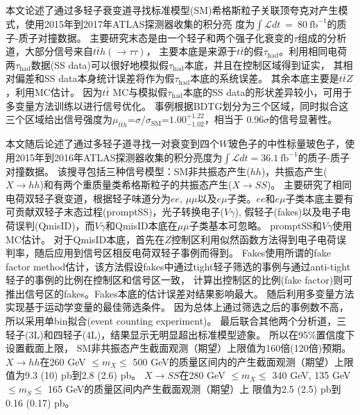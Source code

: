本文论述了通过多轻子衰变道寻找标准模型(SM)希格斯粒子关联顶夸克对产生模式，使用2015年到2017年ATLAS探测器收集的积分亮
度为$\int \mathcal{L}dt~=~80~\text{fb}^{-1}$的质子-质子对撞数据。
主要研究末态是由一个轻子和两个强子化衰变的$\tau$组成的分析道\ltwotau ，大部分信号来自$t\bar{t}h(\rightarrow \tau\tau)$，
主要本底是来源于$t\bar{t}$的假$\tau_{\text{had}}$。利用相同电荷两$\tau_{\text{had}}$数据(SS data)可以很好地模拟假$\tau_{\text{had}}$本底，并且在控制区域得到证实，
其相对偏差和SS data本身统计误差将作为假$\tau_{\text{had}}$本底的系统误差。
其余本底主要是$t\bar{t}Z$，利用MC估计。
因为$t\bar{t}$ MC与模拟假$\tau_{\text{had}}$本底的SS data的形状差异较小，可用于多变量方法训练以进行信号优化。
事例根据BDTG划分为三个区域，同时拟合这三个区域给出信号强度为$\mu_{t\bar{t}h}$=$\sigma/\sigma_{\text{SM}}$=$1.00^{+1.22}_{-1.02}$，相当于
$0.96\sigma$的信号显著性。

本文随后论述了通过多轻子道寻找一对衰变到四个$W$玻色子的中性标量玻色子，使用2015年到2016年ATLAS探测器收集的积分亮度为$\int \mathcal{L}dt=36.1~\text{fb}^{-1}$的质子-质子对撞数据。
该搜寻包括三种信号模型：SM非共振态产生($hh$)，共振态产生($X\rightarrow hh$)和有两个重质量类希格斯粒子的共振态产生($X\rightarrow SS$)。
主要研究了相同电荷双轻子衰变道，根据轻子味道分为$ee$, $\mu\mu$以及$e\mu$子类。$ee$和$e\mu$子类本底主要有可贡献双轻子末态过程(promptSS)，光子转换电子($V\gamma$),
假轻子(fakes)以及电子电荷误判(QmisID)，而$V\gamma$和QmisID本底在$\mu\mu$子类基本可忽略。
promptSS和$V\gamma$使用MC估计。
对于QmisID本底，首先在$Z$控制区利用似然函数方法得到电子电荷误判率，随后应用到信号区相反电荷双轻子事例而得到。
Fakes使用所谓的fake factor method估计，该方法假设fakes中通过tight轻子筛选的事例与通过anti-tight轻子的事例的比例在控制区和信号区一致，
计算出控制区的比例(fake factor)则可推出信号区的fakes。Fakes本底的估计误差对结果影响最大。
随后利用多变量方法实现基于运动学变量的最佳筛选条件。
因为总体上通过筛选之后的事例数不高，所以采用单bin拟合(event counting experiment)。
最后联合其他两个分析道，三轻子(3L)和四轻子(4L)，结果显示无明显超出标准模型迹象。
所以在95\%置信度下设置截面上限，
SM非共振态产生截面观测（期望）上限值为160倍(120倍)预期。
$X\rightarrow hh$在260 GeV $\leq m_X\leq$ 500 GeV的质量区间内的产生截面观测（期望）上限值为9.3 (10) pb到2.8 (2.6) pb。
$X\rightarrow SS$在280 GeV $\leq m_X\leq$ 340 GeV, 135 GeV $\leq m_S\leq$ 165 GeV的质量区间内产生截面观测（期望）上
限值为2.5 (2.5) pb到0.16 (0.17) pb。

